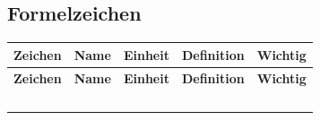 \documentclass[twoside,a4paper]{book}
\begin{document}





\begin{landscape}
\chapter{Formelzeichen}
\label{kap_formelzeichen}


\begin{longtable}{c l l c c}
   \textbf{Zeichen} & \textbf{Name} & \textbf{Einheit} &
   \textbf{Definition} & \textbf{Wichtig}\\
\hline
\endfirsthead

   \textbf{Zeichen} & \textbf{Name} & \textbf{Einheit} &
   \textbf{Definition} & \textbf{Wichtig}\\
~ \\
\endhead



\end{longtable}

\end{landscape}
\end{document}
